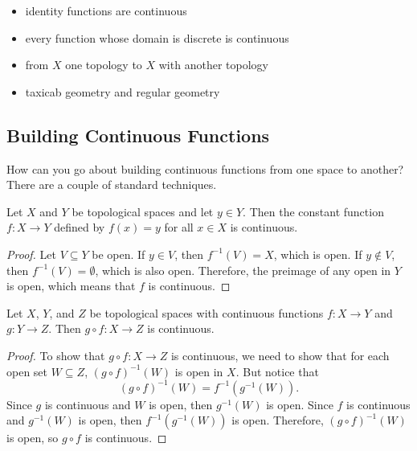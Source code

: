 \documentclass[noname]{notes}
\begin{document}
\begin{example}
	\begin{itemize}
		\item identity functions are continuous
		\item every function whose domain is discrete is continuous 
		\item from $X$ one topology to $X$ with another topology 
		\item taxicab geometry and regular geometry 
	\end{itemize}
\end{example}

\subsection{Building Continuous Functions}

How can you go about building continuous functions from one space to another? There are a couple of standard techniques. 

\begin{proposition}
	Let $X$ and $Y$ be topological spaces and let $y \in Y$. Then the constant function $f \colon X \to Y$ defined by $f(x) = y$ for all $x \in X$ is continuous. 
\end{proposition}

\begin{proof}
	Let $V \subseteq Y$ be open. If $y \in V$, then $f^{-1}(V) = X$, which is open. If $y \not \in V$, then $f^{-1}(V) = \emptyset$, which is also open. Therefore, the preimage of any open in $Y$ is open, which means that $f$ is continuous. 
\end{proof}

\begin{proposition}
\label{composition of continuous is continuous}
	Let $X$, $Y$, and $Z$ be topological spaces with continuous functions $f \colon X \to Y$ and $g \colon Y \to Z$. Then $g \circ f \colon X \to Z$ is continuous. 
\end{proposition}

\begin{proof}
	To show that $g \circ f \colon X \to Z$ is continuous, we need to show that for each open set $W \subseteq Z$, $(g \circ f)^{-1}(W)$ is open in $X$. But notice that 
	\[
		(g \circ f)^{-1}(W) = f^{-1}(g^{-1}(W)). 
	\]
	Since $g$ is continuous and $W$ is open, then $g^{-1}(W)$ is open. Since $f$ is continuous and $g^{-1}(W)$ is open, then $f^{-1}(g^{-1}(W))$ is open. Therefore, $(g \circ f)^{-1}(W)$ is open, so $g \circ f$ is continuous. 
\end{proof}
\end{document}
